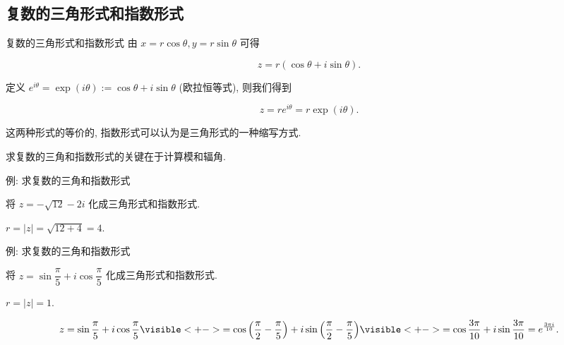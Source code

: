\subsection{复数的三角形式和指数形式}
\begin{frame}{复数的三角形式和指数形式}
	\onslide<+->
	由 $x=r\cos\theta,y=r\sin\theta$ 可得
	\onslide<+->
	\begin{definition}[复数的三角形式]
		\[z=r(\cos\theta+i\sin\theta).\]	
	\end{definition}
	\onslide<+->
	定义 \alert{$e^{i\theta}=\exp(i\theta):=\cos\theta+i\sin\theta$} (欧拉恒等式),
	\onslide<+->
	则我们得到
	\begin{definition}[复数的指数形式]
		\[z=re^{i\theta}=r\exp(i\theta).\]
	\end{definition}
	\onslide<+->
	这两种形式的等价的, 指数形式可以认为是三角形式的一种缩写方式.

	\onslide<+->
	求复数的三角和指数形式的\alert{关键在于计算模和辐角}.
\end{frame}


\begin{frame}{例: 求复数的三角和指数形式}
	\onslide<+->
	\begin{example}
		将 $z=-\sqrt{12}-2i$ 化成三角形式和指数形式.
	\end{example}

	\onslide<+->
	\begin{solution}
		$r=|z|=\sqrt{12+4}=4$.
		\onslide<+->{%
			故
			\[z=4\left[\cos\left(-\frac{5\pi}6\right)+i\sin\left(-
			\frac{5\pi}6\right)\right]=4e^{-\frac{5\pi i}6}.\]
		}
	\end{solution}
\end{frame}


\begin{frame}{例: 求复数的三角和指数形式}
	\beqskip{0pt}
	\onslide<+->
	\begin{example}
		将 $z=\sin\dfrac\pi5+i\cos\dfrac\pi5$ 化成三角形式和指数形式.
	\end{example}
	\onslide<+->
	\begin{solution}
		$r=|z|=1$.
		\onslide<+->{
			故
			\[z=\cos\frac{3\pi}{10}+i\sin\frac{3\pi}{10}=e^{\frac{3\pi i}{10}}.\]
		}
	\end{solution}
	\onslide<+->
	\begin{solution}[另解]
		\[
		z=\sin\frac\pi5+i\cos\frac\pi5
		\visible<+->{=\cos\left(\frac\pi2-\frac\pi5\right)+i\sin\left(\frac\pi2-\frac\pi5\right)}
		\visible<+->{=\cos\frac{3\pi}{10}+i\sin\frac{3\pi}{10}=e^{\frac{3\pi i}{10}}.}
		\]
	\end{solution}
	\endgroup
\end{frame}


